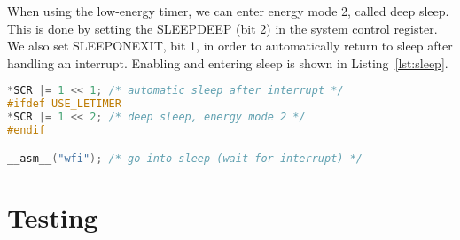 When using the low-energy timer, we can enter energy mode 2, called deep sleep. This is done by setting the SLEEPDEEP (bit 2) in the system control register. We also set SLEEPONEXIT, bit 1, in order to automatically return to sleep after handling an interrupt. Enabling and entering sleep is shown in Listing~\ref{lst:sleep}.

\begin{lstlisting}[language=c, label=lst:sleep, caption=Enabling deep sleep and entering sleep.]
*SCR |= 1 << 1; /* automatic sleep after interrupt */
#ifdef USE_LETIMER
*SCR |= 1 << 2; /* deep sleep, energy mode 2 */
#endif

__asm__("wfi"); /* go into sleep (wait for interrupt) */
\end{lstlisting}

\section{Testing}


